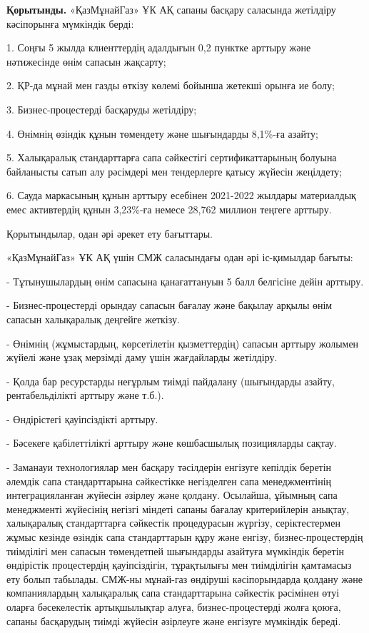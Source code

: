 \begin{multicols}{2}
{\bfseries Қорытынды.} «ҚазМұнайГаз» ҰК АҚ сапаны басқару саласында
жетілдіру кәсіпорынға мүмкіндік берді:

1. Соңғы 5 жылда клиенттердің адалдығын 0,2 пунктке арттыру және
нәтижесінде өнім сапасын жақсарту;

2. ҚР-да мұнай мен газды өткізу көлемі бойынша жетекші орынға ие болу;

3. Бизнес-процестерді басқаруды жетілдіру;

4. Өнімнің өзіндік құнын төмендету және шығындарды 8,1\%-ға азайту;

5. Халықаралық стандарттарға сапа сәйкестігі сертификаттарының болуына
байланысты сатып алу рәсімдері мен тендерлерге қатысу жүйесін жеңілдету;

6. Сауда маркасының құнын арттыру есебінен 2021-2022 жылдары материалдық
емес активтердің құнын 3,23\%-ға немесе 28,762 миллион теңгеге арттыру.

Қорытындылар, одан әрі әрекет ету бағыттары.

«ҚазМұнайГаз» ҰК АҚ үшін СМЖ саласындағы одан әрі іс-қимылдар бағыты:

- Тұтынушылардың өнім сапасына қанағаттануын 5 балл белгісіне дейін
арттыру.

- Бизнес-процестерді орындау сапасын бағалау және бақылау арқылы өнім
сапасын халықаралық деңгейге жеткізу.

- Өнімнің (жұмыстардың, көрсетілетін қызметтердің) сапасын арттыру
жолымен жүйелі және ұзақ мерзімді даму үшін жағдайларды жетілдіру.

- Қолда бар ресурстарды неғұрлым тиімді пайдалану (шығындарды азайту,
рентабельділікті арттыру және т.б.).

- Өндірістегі қауіпсіздікті арттыру.

- Бәсекеге қабілеттілікті арттыру және көшбасшылық позицияларды сақтау.

- Заманауи технологиялар мен басқару тәсілдерін енгізуге кепілдік
беретін әлемдік сапа стандарттарына сәйкестікке негізделген сапа
менеджментінің интеграцияланған жүйесін әзірлеу және қолдану. Осылайша,
ұйымның сапа менеджменті жүйесінің негізгі міндеті сапаны бағалау
критерийлерін анықтау, халықаралық стандарттарға сәйкестік процедурасын
жүргізу, серіктестермен жұмыс кезінде өзіндік сапа стандарттарын құру
және енгізу, бизнес-процестердің тиімділігі мен сапасын төмендетпей
шығындарды азайтуға мүмкіндік беретін өндірістік процестердің
қауіпсіздігін, тұрақтылығы мен тиімділігін қамтамасыз ету болып
табылады. СМЖ-ны мұнай-газ өндіруші кәсіпорындарда қолдану және
компаниялардың халықаралық сапа стандарттарына сәйкестік рәсімінен өтуі
оларға бәсекелестік артықшылықтар алуға, бизнес-процестерді жолға қоюға,
сапаны басқарудың тиімді жүйесін әзірлеуге және енгізуге мүмкіндік
береді.
\end{multicols}

